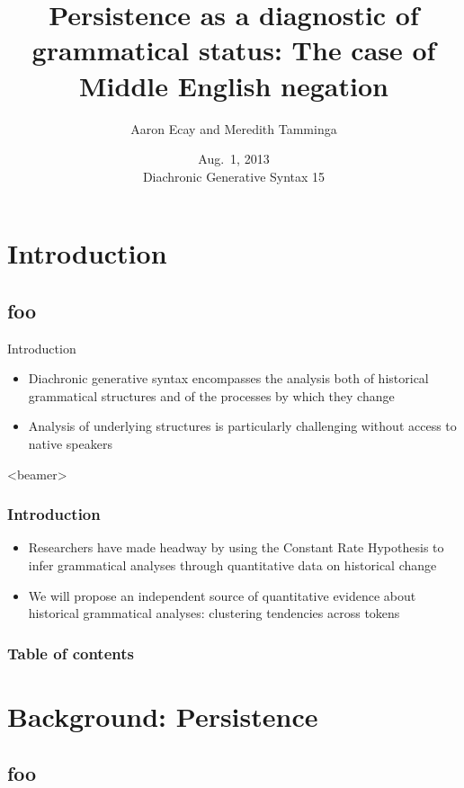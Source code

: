 \documentclass{digs-slides}
\title{Persistence as a diagnostic of grammatical status: The case of Middle English negation}
\author{Aaron Ecay and Meredith Tamminga}
\institute{University of Pennsylvania}
\date{Aug.\ 1, 2013 \\\vspace{0.5em} Diachronic Generative Syntax 15}
\begin{document}
\begin{frame}
    \titlepage
\end{frame}

\section{Introduction}

\subsection*{foo}

\begin{frame}{Introduction}
    \begin{itemize}
      \item Diachronic generative syntax encompasses the analysis both
        of historical grammatical structures and of the processes by
        which they change
      \item Analysis of underlying structures is particularly challenging
        without access to native speakers
    \end{itemize}
\end{frame}

\begin{frame}<beamer>
    \frametitle{Introduction}
    \begin{itemize}
      \item Researchers have made headway by using the Constant Rate
        Hypothesis \parencite{Kroch1989} to infer grammatical
        analyses through quantitative data on historical change
      \item We will propose an independent source of quantitative
        evidence about historical grammatical analyses: clustering
        tendencies across tokens
    \end{itemize}
\end{frame}

\begin{frame}
    \frametitle{Table of contents}
    \tableofcontents{}
\end{frame}

\section{Background: Persistence}

\subsection*{foo}
\end{document}
